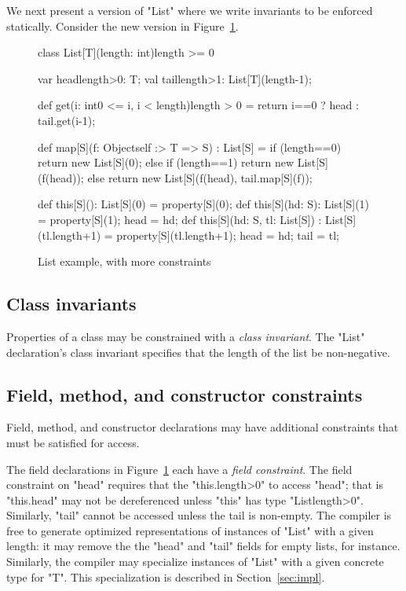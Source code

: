 We next present a version of \xcd"List" where we write
invariants to be enforced statically.  Consider the new version
in Figure~\ref{fig:list}.

\begin{figure}
{\footnotesize
\begin{xtennoindent}
class List[T](length: int){length >= 0} {
  var head{length>0}: T;
  val tail{length>1}: List[T](length-1);

  def get(i: int{0 <= i, i < length}){length > 0} = {
    return i==0 ? head : tail.get(i-1);
  }

  def map[S](f: Object{self :> T} => S) : List[S] = {
    if (length==0)
      return new List[S](0);
    else if (length==1)
      return new List[S](f(head));
    else
      return new List[S](f(head), tail.map[S](f));
  }

  def this[S](): List[S](0) = property[S](0);
  def this[S](hd: S): List[S](1) = {
    property[S](1); head = hd;
  }
  def this[S](hd: S, tl: List[S]) : List[S](tl.length+1) = {
    property[S](tl.length+1);
    head = hd; tail = tl;
  }
}
\end{xtennoindent}}
\caption{List example, with more constraints}
\label{fig:list}
\end{figure}

\subsection{Class invariants}

Properties of a class may be constrained with 
a \emph{class invariant}.   
The \xcd"List" declaration's class invariant specifies that the length of
the list be non-negative.

\subsection{Field, method, and constructor constraints}

Field, method, and constructor declarations may have additional
constraints that must be satisfied for access.

The field  declarations in Figure~\ref{fig:list}
each have a \emph{field constraint}.  The field constraint on
\xcd"head" requires that the \xcd"this.length>0" to access
\xcd"head"; that is \xcd"this.head" may not be dereferenced
unless \xcd"this" has type \xcd"List{length>0}".  Similarly,
\xcd"tail" cannot be accessed unless the tail is non-empty.  The
compiler is free to generate optimized representations of
instances of \xcd"List" with a given length: it may remove the
the \xcd"head" and \xcd"tail" fields for empty lists, for
instance.  Similarly, the compiler may specialize instances of
\xcd"List" with a given concrete type for \xcd"T".  This
specialization is described in Section~\ref{sec:impl}.

